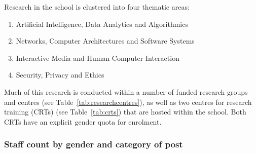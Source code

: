 
Research in the school is clustered into four thematic areas:
\begin{enumerate}[noitemsep]
    \item Artificial Intelligence, Data Analytics and Algorithmics
    \item Networks, Computer Architectures and Software Systems 
    \item Interactive Media and Human Computer Interaction
    \item Security, Privacy and Ethics
\end{enumerate}


Much of this research is conducted within a number of funded research groups and centres (see 
Table~\ref{tab:researchcentres}), as well as two centres for research training (CRTs) (see Table~\ref{tab:crts}) that are hosted within the school. Both CRTs have an explicit gender quota for enrolment. 








\subsubsection{Staff count by gender and category of post}

